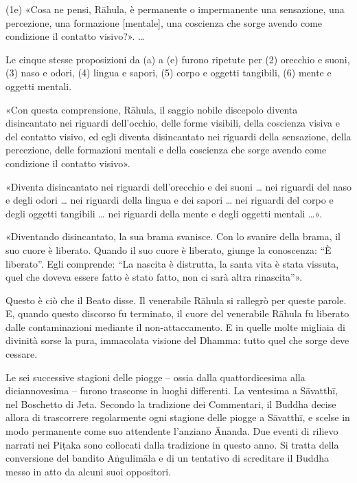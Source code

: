 (1e) «Cosa ne pensi, Rāhula, è permanente o impermanente una sensazione,
una percezione, una formazione [mentale], una coscienza che sorge avendo
come condizione il contatto visivo?». …

 Le cinque stesse proposizioni da (a) a (e) furono
ripetute per (2) orecchio e suoni, (3) naso e odori, (4) lingua e sapori, (5)
corpo e oggetti tangibili, (6) mente e oggetti mentali.

 «Con questa comprensione, Rāhula, il saggio nobile discepolo
diventa disincantato nei riguardi dell’occhio, delle forme visibili, della
coscienza visiva e del contatto visivo, ed egli diventa disincantato nei
riguardi della sensazione, della percezione, delle formazioni mentali e della
coscienza che sorge avendo come condizione il contatto visivo».

«Diventa disincantato nei riguardi dell’orecchio e dei suoni … nei riguardi del
naso e degli odori … nei riguardi della lingua e dei sapori … nei riguardi del
corpo e degli oggetti tangibili … nei riguardi della mente e degli oggetti
mentali …».

«Diventando disincantato, la sua brama svanisce. Con lo svanire della brama, il
suo cuore è liberato. Quando il suo cuore è liberato, giunge la conoscenza: “È
liberato”. Egli comprende: “La nascita è distrutta, la santa vita è stata
vissuta, quel che doveva essere fatto è stato fatto, non ci sarà altra
rinascita”».

Questo è ciò che il Beato disse. Il venerabile Rāhula si rallegrò per queste
parole. E, quando questo discorso fu terminato, il cuore del venerabile Rāhula
fu liberato dalle contaminazioni mediante il non-attaccamento. E in quelle molte
migliaia di divinità sorse la pura, immacolata visione del Dhamma: tutto quel
che sorge deve cessare.


 Le sei successive stagioni delle piogge – ossia
dalla quattordicesima alla diciannovesima – furono trascorse in luoghi
differenti. La ventesima a Sāvatthī, nel Boschetto di Jeta. Secondo la
tradizione dei Commentari, il Buddha decise allora di trascorrere regolarmente
ogni stagione delle piogge a Sāvatthī, e scelse in modo permanente come suo
attendente l’anziano Ānanda. Due eventi di rilievo narrati nei Piṭaka sono
collocati dalla tradizione in questo anno. Si tratta della conversione del
bandito Aṅgulimāla e di un tentativo di screditare il Buddha messo in atto da
alcuni suoi oppositori.

